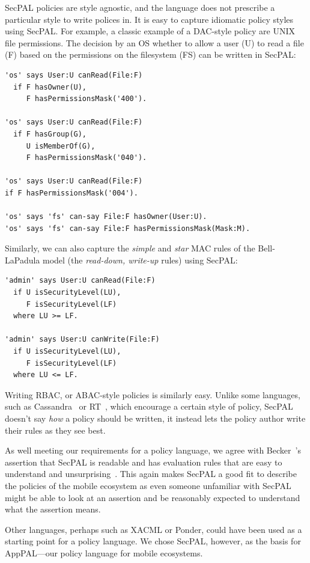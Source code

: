 \documentclass[thesis.tex]{subfiles}
\begin{document}
SecPAL policies are style agnostic, and the language does not
prescribe a particular style to write polices in.
It is easy to capture idiomatic policy styles using SecPAL.  For example, a classic example of a DAC-style policy are UNIX file permissions.  
The decision by an OS whether to allow a user (U) to read a file (F) based on the permissions on the filesystem (FS) can be written in SecPAL:
\begin{lstlisting}
'os' says User:U canRead(File:F)
  if F hasOwner(U),
     F hasPermissionsMask('400').

'os' says User:U canRead(File:F)
  if F hasGroup(G),
     U isMemberOf(G),
     F hasPermissionsMask('040').

'os' says User:U canRead(File:F)
if F hasPermissionsMask('004').

'os' says 'fs' can-say File:F hasOwner(User:U).
'os' says 'fs' can-say File:F hasPermissionsMask(Mask:M).
\end{lstlisting}
Similarly, we can also capture the \emph{simple} and
\emph{star} MAC rules of the Bell-LaPadula model (the \emph{read-down,
write-up} rules) using SecPAL:
\begin{lstlisting}
'admin' says User:U canRead(File:F)
  if U isSecurityLevel(LU),
     F isSecurityLevel(LF)
  where LU >= LF.

'admin' says User:U canWrite(File:F)
  if U isSecurityLevel(LU),
     F isSecurityLevel(LF)
  where LU <= LF.
\end{lstlisting} Writing RBAC, or ABAC-style policies is similarly
easy.  Unlike some languages, such as Cassandra~\cite{becker_cassandra:_2004} or RT~\cite{li_design_2002}, which encourage
a certain style of policy, SecPAL doesn't say \emph{how} a policy
should be written, it instead lets the policy author write their rules
as they see best.

As well meeting our requirements for a policy language, we agree with Becker~\etal's assertion that SecPAL is
readable and has evaluation rules that are easy to understand and unsurprising~\cite{becker_secpal:_2006}.
This again makes SecPAL a good fit to describe the policies of the mobile
ecosystem as even someone unfamiliar with SecPAL might be able to look at an
assertion and be reasonably expected to understand what the assertion means.

Other languages, perhaps such as XACML or Ponder, could have been used as a
starting point for a policy language. We chose SecPAL, however, as the basis for
AppPAL---our policy language for mobile ecosystems.
\end{document}
